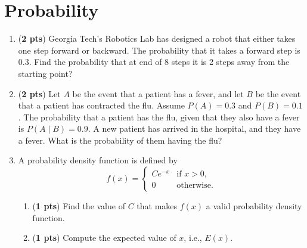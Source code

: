 \documentclass[11pt, letterpaper]{article}
\begin{document}
\begin{enumerate}[label=(\alph*)]
    


\end{enumerate}

\newpage
\section{Probability}
\begin{enumerate}[label=(\alph*)]

\item (\textbf{2 pts}) Georgia Tech's Robotics Lab has designed a robot that either takes one step forward or backward. The probability that it takes a forward step is 0.3. Find the probability that at end of 8 steps it is 2 steps away from the starting point?


\item (\textbf{2 pts}) Let $A$ be the event that a patient has a fever, and let $B$ be the event that a patient has contracted the flu. Assume $P(A) = 0.3$ and $P(B) = 0.1$. The probability that a patient has the flu, given that they also have a fever is $P(A\mid B) = 0.9$. A new patient has arrived in the hospital, and they have a fever. What is the probability of them having the flu?

    \item
        A probability density function is defined by
        $$
	        f(x)=
	        \begin{cases}
		        Ce^{-x} & \text{if } x>0, \\
		        0 & \text{otherwise}.
	        \end{cases}
        $$
        \begin{enumerate}[label=(\roman*)]
	        \item (\textbf{1 pts}) Find the value of $C$ that makes $f(x)$ a valid probability density function.
	        \item (\textbf{1 pts}) Compute the expected value of $x$, i.e., $E(x)$.
        \end{enumerate}


\end{enumerate}
\end{document}
